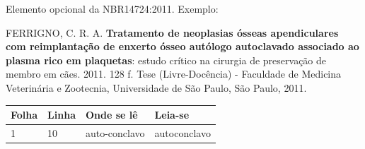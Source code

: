 \documentclass[
12pt,        %
openright,   %
twoside,     %
a4paper,     %
english,       %
brazil,        %
%
%
]{ppgca}
\begin{document}
\begin{errata}
Elemento opcional da NBR14724:2011. Exemplo:

\vspace{\onelineskip}

FERRIGNO, C. R. A. \textbf{Tratamento de neoplasias ósseas apendiculares com
reimplantação de enxerto ósseo autólogo autoclavado associado ao plasma
rico em plaquetas}: estudo crítico na cirurgia de preservação de membro em
cães. 2011. 128 f. Tese (Livre-Docência) - Faculdade de Medicina Veterinária e
Zootecnia, Universidade de São Paulo, São Paulo, 2011.

\begin{table}[htb]
\center
\footnotesize
\begin{tabular}{|p{1.4cm}|p{1cm}|p{3cm}|p{3cm}|}
  \hline
   \textbf{Folha} & \textbf{Linha}  & \textbf{Onde se lê}  & \textbf{Leia-se}  \\
    \hline
    1 & 10 & auto-conclavo & autoconclavo\\
   \hline
\end{tabular}
\end{table}

\end{errata}

\end{document}
